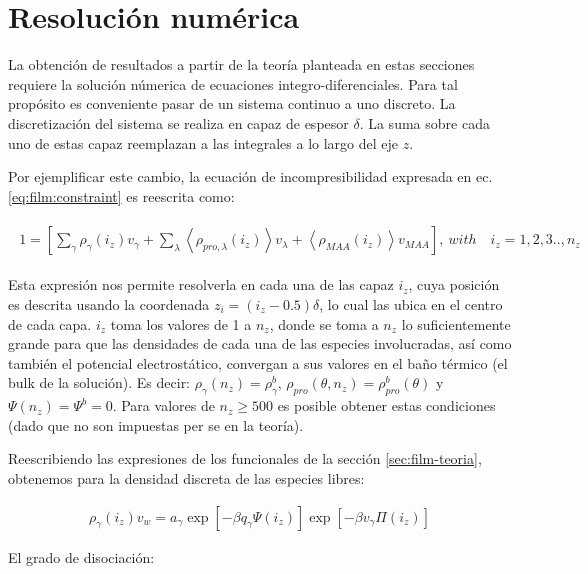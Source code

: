 \section{Resoluci\'on num\'erica}\label{sec:film:reso-numerica}

La obtenci\'on de resultados a partir de la teor\'ia planteada en estas secciones requiere la soluci\'on n\'umerica de ecuaciones integro-diferenciales. Para tal prop\'osito es conveniente pasar de un sistema continuo a uno discreto. 
La discretizaci\'on del sistema se realiza en capaz de espesor $\delta$. La suma sobre cada uno de estas capaz reemplazan a las integrales a lo largo del eje $z$.

Por ejemplificar este cambio, la ecuaci\'on de incompresibilidad expresada en ec. \ref{eq:film:constraint} es reescrita como:


\begin{align}
	\begin{aligned}
		1=  {\left[\sum_{\gamma}\rho_\gamma(i_z) v_\gamma + \sum_\lambda{\left<\rho_{pro,\lambda}(i_z)\right>v_\lambda} + \left<\rho_{MAA}(i_z)\right>v_{MAA} \right]},~ with \quad  i_z =1,2,3.., n_z
	\end{aligned}
\label{eq:film:discreto-constraint}
\end{align}

Esta expresi\'on nos permite resolverla en cada una de las capaz $i_z$, cuya posición es descrita usando la coordenada $z_i = (i_z -0.5)\delta$, lo cual las ubica en el centro de cada capa. $i_z$ toma los valores de 1 a $n_z$, donde se toma a $n_z$ lo suficientemente grande para que las densidades de cada una de las especies involucradas, as\'i como tambi\'en el potencial electrost\'atico, convergan a sus valores en el ba\~no t\'ermico (el bulk de la soluci\'on).
Es decir: $\rho_\gamma(n_z) = \rho^b_\gamma$, $\rho_{pro}(\theta,n_z) = \rho^b_{pro}(\theta)$ y $\Psi(n_z) = \Psi^b =0$.
Para valores de $n_z \geq 500$ es posible obtener estas condiciones (dado que no son impuestas per se en la teor\'ia).

Reescribiendo las expresiones de los funcionales de la secci\'on \ref{sec:film-teoria}, obtenemos para la densidad discreta de las especies libres:

\begin{align}
	\rho_\gamma(i_z)v_w = a_\gamma \exp\left[-\beta q_\gamma\Psi(i_z)\right] \exp\left[-\beta v_\gamma\Pi(i_z)\right]
\end{align}


El grado de disociaci\'on:

